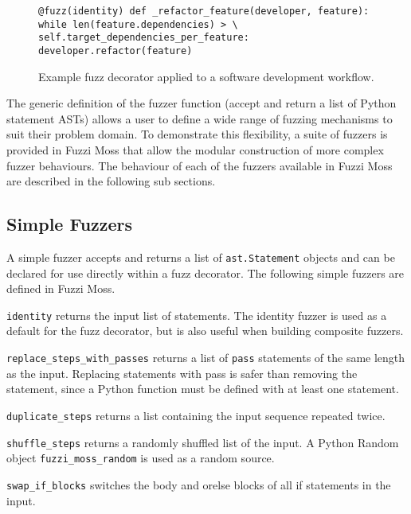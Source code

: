 \documentclass{sig-alternate}
\newenvironment{FunctionList}{%
\lstset{basicstyle=\ttfamily\bfseries\small}
\begin{list}{}{\leftmargin=5pt}
}{\end{list}\lstset{basicstyle=\ttfamily\small}}
\begin{document}
 \begin{figure}
   \centering
  \begin{lstlisting}
@fuzz(identity) def _refactor_feature(developer, feature): while len(feature.dependencies) > \
self.target_dependencies_per_feature: developer.refactor(feature)
\end{lstlisting}
  
   \caption{Example fuzz decorator applied to a software development workflow.}
   \label{fig:fuzz}
 \end{figure}

 The generic definition of the fuzzer function (accept and return a list of Python statement ASTs) allows a user to
 define a wide range of fuzzing mechanisms to suit their problem domain.  To demonstrate this flexibility, a suite of
 fuzzers is provided in Fuzzi Moss that allow the modular construction of more complex fuzzer behaviours.  The behaviour
 of each of the fuzzers available in Fuzzi Moss are described in the following sub sections.


 \subsection{Simple Fuzzers}


 A simple fuzzer accepts and returns a list of \lstinline!ast.Statement! objects and can be declared for use directly
 within a fuzz decorator.  The following simple fuzzers are defined in Fuzzi Moss.

 \begin{FunctionList}

 \item\lstinline!identity! returns the input list of statements.  The identity fuzzer is used as a default for the fuzz
   decorator, but is also useful when building composite fuzzers.

 \item\lstinline!replace_steps_with_passes! returns a list of \lstinline!pass!  statements of the same length as the
   input.  Replacing statements with pass is safer than removing the statement, since a Python function must be defined
   with at least one statement.

 \item\lstinline!duplicate_steps! returns a list containing the input sequence repeated twice.

 \item\lstinline!shuffle_steps! returns a randomly shuffled list of the input.  A Python Random object
   \lstinline!fuzzi_moss_random! is used as a random source.

 \item \lstinline!swap_if_blocks! switches the body and orelse blocks of all if statements in the input.

 \end{FunctionList}
\end{document}

